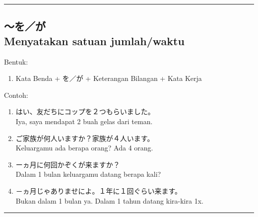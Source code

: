 \vspace{0.2cm}\hrule height 1pt\vspace{0.2cm}


\subsection*{
    ～を／が \\
    Menyatakan satuan jumlah/waktu
}
Bentuk:
\begin{enumerate}
    \item Kata Benda + を／が + Keterangan Bilangan + Kata Kerja
\end{enumerate}
Contoh: 
\begin{enumerate}
    \item はい、友だちにコップを２つもらいました。
    \\ Iya, saya mendapat 2 buah gelas dari teman.
    \item ご家族が何人いますか？家族が４人います。
    \\ Keluargamu ada berapa orang? Ada 4 orang.
    \item ーヵ月に何回かぞくが来ますか？
    \\ Dalam 1 bulan keluargamu datang berapa kali?
    \item －ヵ月じゃありませによ。１年に１回ぐらい来ます。
    \\ Bukan dalam 1 bulan ya. Dalam 1 tahun datang kira-kira 1x.
\end{enumerate}

\vspace{0.2cm}\hrule height 1pt\vspace{0.2cm}
